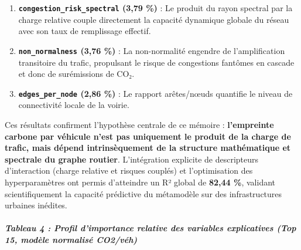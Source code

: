 \documentclass[10pt, a4paper]{article}
\begin{document}
\begin{enumerate}
  (proportion de sens uniques) pénalise la fluidité globale en
  allongeant les trajets et en concentrant les véhicules sur des axes
  obligatoires.
\item
  \textbf{\texttt{congestion\_risk\_spectral} (3,79 \%)} : Le produit du
  rayon spectral par la charge relative couple directement la capacité
  dynamique globale du réseau avec son taux de remplissage effectif.
\item
  \textbf{\texttt{non\_normalness} (3,76 \%)} : La non-normalité
  engendre de l'amplification transitoire du trafic, propulsant le
  risque de congestions fantômes en cascade et donc de surémissions de
  CO₂.
\item
  \textbf{\texttt{edges\_per\_node} (2,86 \%)} : Le rapport arêtes/nœuds
  quantifie le niveau de connectivité locale de la voirie.
\end{enumerate}

Ces résultats confirment l'hypothèse centrale de ce mémoire :
\textbf{l'empreinte carbone par véhicule n'est pas uniquement le produit
de la charge de trafic, mais dépend intrinsèquement de la structure
mathématique et spectrale du graphe routier}. L'intégration explicite de
descripteurs d'interaction (charge relative et risques couplés) et
l'optimisation des hyperparamètres ont permis d'atteindre un R² global
de \textbf{82,44 \%}, validant scientifiquement la capacité prédictive
du métamodèle sur des infrastructures urbaines inédites.

\subparagraph{Tableau 4 : Profil d'importance relative des variables
explicatives (Top 15, modèle normalisé
CO2/véh)}\label{tableau-4-profil-dimportance-relative-des-variables-explicatives-top-15-moduxe8le-normalisuxe9-co2vuxe9h}
\end{document}
